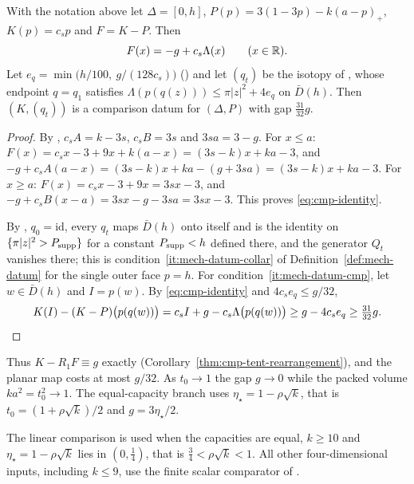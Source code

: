 \begin{proposition}\label{prop:cmp-linear}
With the notation above let $\Delta=[0,h]$, $P(p)=3(1-3p)-k(a-p)_+$, $K(p)=c_sp$ and $F=K-P$. Then
\begin{equation}\label{eq:cmp-identity}
 F(x)=-g+c_s\Lambda(x)\qquad(x\in\mathbb{R}).
\end{equation}
Let $e_q=\min\bigl(h/100,\ g/(128c_s)\bigr)$ () and let $(q_t)$ be the isotopy of
, whose endpoint $q=q_1$ satisfies $\Lambda(p(q(z)))\le\pi|z|^2+4e_q$ on $\bar D(h)$.
Then $(K,(q_t))$ is a comparison datum for $(\Delta,P)$ with gap $\tfrac{31}{32}g$.
\end{proposition}

\begin{proof}
By , $c_sA=k-3s$, $c_sB=3s$ and $3sa=3-g$. For $x\le a$:
$F(x)=c_sx-3+9x+k(a-x)=(3s-k)x+ka-3$, and $-g+c_sA(a-x)=(3s-k)x+ka-(g+3sa)=(3s-k)x+ka-3$. For $x\ge a$:
$F(x)=c_sx-3+9x=3sx-3$, and $-g+c_sB(x-a)=3sx-g-3sa=3sx-3$. This proves \eqref{eq:cmp-identity}.

By , $q_0=\mathrm{id}$, every $q_t$ maps $\bar D(h)$ onto itself and is the identity on
$\{\pi|z|^2>P_{\rm supp}\}$ for a constant $P_{\rm supp}<h$ defined there, and the generator $Q_t$ vanishes there; this
is condition~\ref{it:mech-datum-collar} of Definition~\ref{def:mech-datum} for the single outer face $p=h$. For condition~\ref{it:mech-datum-cmp}, let
$w\in\bar D(h)$ and $I=p(w)$. By \eqref{eq:cmp-identity} and $4c_se_q\le g/32$,
\[
 K(I)-(K-P)\bigl(p(q(w))\bigr)=c_sI+g-c_s\Lambda\bigl(p(q(w))\bigr)\ge g-4c_se_q\ge\tfrac{31}{32}g .\qedhere
\]
\end{proof}

Thus $K-R_1F\equiv g$ exactly (Corollary~\ref{thm:cmp-tent-rearrangement}), and the planar map costs at most $g/32$.
As $t_0\to1$ the gap $g\to0$ while the packed volume $ka^2=t_0^2\to1$. The equal-capacity branch uses
$\eta_\star=1-\rho\sqrt k$, that is $t_0=(1+\rho\sqrt k)/2$ and $g=3\eta_\star/2$.

\begin{remark}\label{rem:cmp-small-k}
The linear comparison is used when the capacities are equal, $k\ge10$ and
$\eta_\star=1-\rho\sqrt k$ lies in $(0,\frac14)$, that is $\frac34<\rho\sqrt k<1$. All other four-dimensional
inputs, including $k\le9$, use the finite scalar comparator of
.
\end{remark}

